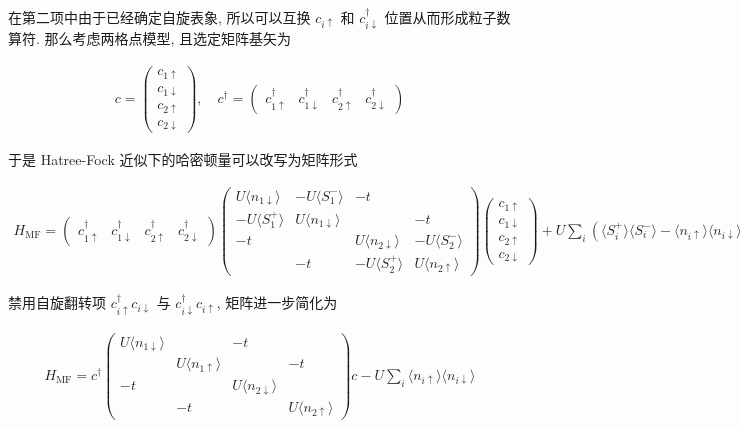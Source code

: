 \documentclass[../../main.tex]{subfiles}
\begin{document}
在第二项中由于已经确定自旋表象, 所以可以互换 $c_{i\uparrow}$ 和 $c_{i\downarrow}^{\dagger}$ 位置从而形成粒子数算符. 那么考虑两格点模型, 且选定矩阵基矢为

\begin{align*}
  c = \begin{pmatrix}
    c_{1\uparrow} \\
    c_{1\downarrow} \\
    c_{2\uparrow} \\
    c_{2\downarrow}
  \end{pmatrix}, \quad c^{\dagger} = \begin{pmatrix}
    c_{1\uparrow}^{\dagger} & c_{1\downarrow}^{\dagger} & c_{2\uparrow}^{\dagger} & c_{2\downarrow}^{\dagger}
  \end{pmatrix}
\end{align*}

于是 Hatree-Fock 近似下的哈密顿量可以改写为矩阵形式

\begin{align*}
  H_{\text{MF}} = \begin{pmatrix}
    c_{1\uparrow}^{\dagger} & c_{1\downarrow}^{\dagger} & c_{2\uparrow}^{\dagger} & c_{2\downarrow}^{\dagger}
  \end{pmatrix}\begin{pmatrix}
    U\langle n_{1\downarrow}\rangle & -U\langle S_{1}^{-}\rangle & -t & \\
    -U\langle S_{1}^{+}\rangle & U\langle n_{1\downarrow}\rangle & & -t\\
    -t & & U\langle n_{2\downarrow}\rangle & -U\langle S_{2}^{-}\rangle \\
     & -t & -U\langle S_{2}^{+}\rangle & U\langle n_{2\uparrow}\rangle
  \end{pmatrix}\begin{pmatrix}
    c_{1\uparrow} \\
    c_{1\downarrow} \\
    c_{2\uparrow} \\
    c_{2\downarrow}
  \end{pmatrix} + U\sum_{i}(\langle S_{i}^{+}\rangle\langle S_{i}^{-}\rangle - \langle n_{i\uparrow}\rangle\langle n_{i\downarrow}\rangle)
\end{align*}

禁用自旋翻转项 $c_{i\uparrow}^{\dagger}c_{i\downarrow}$ 与 $c_{i\downarrow}^{\dagger}c_{i\uparrow}$, 矩阵进一步简化为

\begin{align*}
  H_{\text{MF}} = c^{\dagger}\begin{pmatrix}
    U\langle n_{1\downarrow}\rangle &  & -t & \\
     & U\langle n_{1\uparrow}\rangle & & -t\\
    -t & & U\langle n_{2\downarrow}\rangle &  \\
     & -t &  & U\langle n_{2\uparrow}\rangle
  \end{pmatrix}c-U\sum_{i}\langle n_{i\uparrow}\rangle\langle n_{i\downarrow}\rangle
\end{align*}
\end{document}
